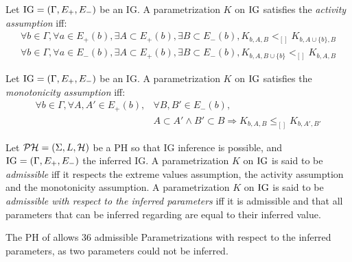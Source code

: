 \begin{property}
\label{prop:param_enum_activity}
Let $\mathrm{IG} = (\Gamma, E_+, E_-)$ be an IG. A parametrization $K$ on $\mathrm{IG}$ satisfies the \emph{activity assumption} iff:
\begin{align*}
  \forall b \in \Gamma, \forall a \in E_+(b), \exists A \subset E_+(b), \exists B \subset E_-(b),
    K_{b,A,B} <_{[]} K_{b,A \cup \{b\},B}
\\
  \forall b \in \Gamma, \forall a \in E_-(b), \exists A \subset E_+(b), \exists B \subset E_-(b),
    K_{b,A,B \cup \{b\}} <_{[]} K_{b,A,B}
\end{align*}
\end{property}

\begin{property}
\label{prop:param_enum_monotonicity}
Let $\mathrm{IG} = (\Gamma, E_+, E_-)$ be an IG. A parametrization $K$ on $\mathrm{IG}$ satisfies the \emph{monotonicity assumption} iff:
\begin{align*}
  \forall b \in \Gamma, \forall A, A' \in E_+(b), &\forall B, B' \in E_-(b),
\\
  &A \subset A' \wedge B' \subset B \Rightarrow K_{b,A,B} \leq_{[]} K_{b,A',B'}
\end{align*}
\end{property}

\begin{definition}
\label{def:param_enum_inf}
Let $\mathcal{PH} = (\Sigma, L, \mathcal{H})$ be a PH so that IG inference is possible, and $\mathrm{IG} = (\Gamma, E_+,
E_-)$ the inferred IG.
A parametrization $K$ on $\mathrm{IG}$ is said to be \emph{admissible} iff it respects
the extreme values assumption, the activity assumption and the monotonicity assumption.
A parametrization $K$ on $\mathrm{IG}$ is said to be \emph{admissible with respect to the
inferred parameters} iff it is admissible and that all parameters that can be inferred regarding
 are equal to their inferred value.
\end{definition}


\begin{example*}
The PH of  allows 36 admissible Parametrizations with respect to the inferred parameters,
as two parameters could not be inferred.
\end{example*}



